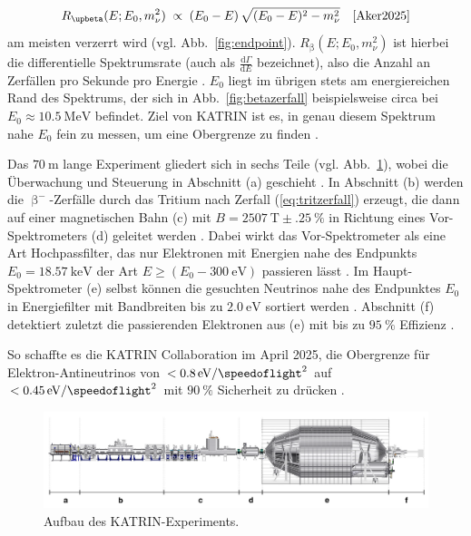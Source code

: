 \documentclass[a4paper,12pt]{article}
\newcommand{\figref}[1]{Abb.~\ref{#1}}
\begin{document}
\begin{equation}
R_{\upbeta}(E;E_0,m_\nu^2)\;\propto\;(E_0 - E)\,\sqrt{(E_0 - E)^2 - m_\nu^2} \hspace{1em}\text{\cite[180]{Aker2025}}
\label{eq:diffspec}
\end{equation}
am meisten verzerrt wird (vgl. \figref{fig:endpoint}). $R_{\upbeta}(E;E_0,m_\nu^2)$ ist hierbei die differentielle Spektrumsrate (auch als $\frac{\mathrm{d}\Gamma}{\mathrm{d}E}$ bezeichnet), also die Anzahl an Zerfällen pro Sekunde pro Energie \cite[2--3]{Kleesiek2019}. $E_0$ liegt im übrigen stets am energiereichen Rand des Spektrums, der sich in \figref{fig:betazerfall} beispielsweise circa bei $E_0\approx \qty{10,5}{\mega\electronvolt}$ befindet. Ziel von KATRIN ist es, in genau diesem Spektrum nahe $E_0$ fein zu messen, um eine Obergrenze zu finden \cite[180]{Aker2025}.
\par
Das $\qty{70}{\meter}$ lange Experiment gliedert sich in sechs Teile (vgl. \figref{fig:katrin}), wobei die Überwachung und Steuerung in Abschnitt (a) geschieht \cite[6]{Kleesiek2019}. In Abschnitt (b) werden die $\upbeta^-$-Zerfälle durch das Tritium nach Zerfall (\ref{eq:tritzerfall}) erzeugt, die dann auf einer magnetischen Bahn (c) mit $B=\qty{2507}{\tesla} \pm \qty{,25}{\percent}$ \cite[180]{Aker2025} in Richtung eines Vor-Spektrometers (d) geleitet werden \cite[6]{Kleesiek2019}. Dabei wirkt das Vor-Spektrometer als eine Art Hochpassfilter, das nur Elektronen mit Energien nahe des Endpunkts $E_0=\qty{18,57}{\kilo\electronvolt}$ der Art $E\geq (E_0- \qty{300}{\electronvolt})$ passieren lässt \cite[1--3]{Prall2012}. Im Haupt-Spektrometer (e) selbst können die gesuchten Neutrinos nahe des Endpunktes $E_0$ in Energiefilter mit Bandbreiten bis zu $\qty{2,0}{\electronvolt}$ sortiert werden \cite[181]{Aker2025}. Abschnitt (f) detektiert zuletzt die passierenden Elektronen aus (e) mit bis zu $\qty{95}{\percent}$ Effizienz \cite[181]{Aker2025}. \par
So schaffte es die KATRIN Collaboration im April 2025, die Obergrenze für Elektron-Antineutrinos von $<\qty[per-mode=symbol]{,8}{\electronvolt\per\square\speedoflight}$ auf $<\qty[per-mode=symbol]{,45}{\electronvolt\per\square\speedoflight}$ mit $\qty{90}{\percent}$ Sicherheit zu drücken \cite[180]{Aker2025}.
\begin{figure}[b!]
\includegraphics[width=\textwidth]{KATRIN}
\caption[Aufbau des KATRIN-Experiments. -- Quelle: {\cite[][6]{Kleesiek2019}}]{Aufbau des KATRIN-Experiments.}
\label{fig:katrin}
\end{figure}
\end{document}
